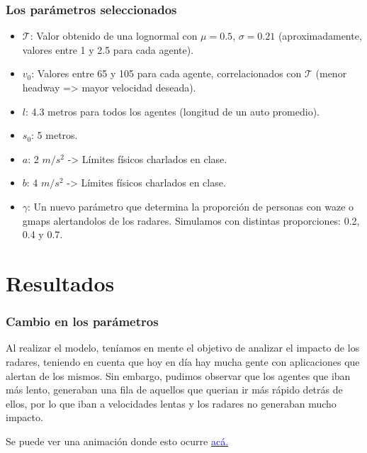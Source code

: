 \documentclass[10pt, compress]{beamer}
\begin{document}
\begin{frame}[fragile]

\frametitle{Los par\'ametros seleccionados}

\begin{itemize}

\item $\mathcal{T}$: Valor obtenido de una lognormal con $\mu = 0.5$, $\sigma = 0.21$ (aproximadamente, valores entre 1 y 2.5 para cada agente).
\item $v_0$: Valores entre 65 y 105 para cada agente, correlacionados con $\mathcal{T}$ (menor headway => mayor velocidad deseada).
\item $l$: 4.3 metros para todos los agentes (longitud de un auto promedio).
\item $s_0$: 5 metros.
\item $a$: 2 $m/s^2$ -> Límites físicos charlados en clase.
\item $b$: 4 $m/s^2$ -> Límites físicos charlados en clase.
\item $\gamma$: Un nuevo par\'ametro que determina la proporci\'on de personas con waze o gmaps alertandolos de los radares. Simulamos con distintas proporciones: 0.2, 0.4 y 0.7.

\end{itemize}

\end{frame}

\section{Resultados}

\begin{frame}
\frametitle{Cambio en los par\'ametros}

Al realizar el modelo, ten\'iamos en mente el objetivo de analizar el impacto de los radares, teniendo en cuenta que hoy en d\'ia hay mucha gente con aplicaciones que alertan de los mismos. Sin embargo, pudimos observar que los agentes que iban m\'as lento, generaban una fila de aquellos que querian ir m\'as r\'apido detr\'as de ellos, por lo que iban a velocidades lentas y los radares no generaban mucho impacto.

Se puede ver una animaci\'on donde esto ocurre \href{https://youtu.be/NnljPUTmnGE}{\textcolor{blue}{ac\'a.}}

\end{frame}
\end{document}

